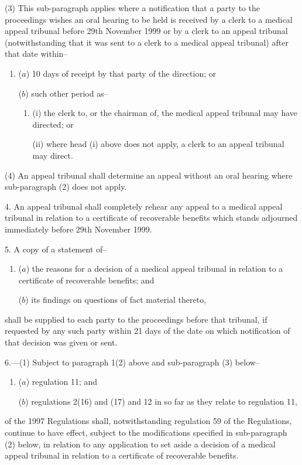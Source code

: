 \documentclass[12pt,a4paper]{article}
\begin{document}
(3) This sub-paragraph applies where a notification that a party to the proceedings wishes an oral hearing to be held is received by a clerk to a medical appeal tribunal before 29th November 1999 or by a clerk to an appeal tribunal (notwithstanding that it was sent to a clerk to a medical appeal tribunal) after that date within–
\begin{enumerate}\item[]
($a$) 10 days of receipt by that party of the direction; or

($b$) such other period as–
\begin{enumerate}\item[]
(i) the clerk to, or the chairman of, the medical appeal tribunal may have directed; or

(ii) where head (i)  above does not apply, a clerk to an appeal tribunal may direct.
\end{enumerate}
\end{enumerate}

(4) An appeal tribunal shall determine an appeal without an oral hearing where sub-paragraph (2) does not apply.

\medskip

4.  An appeal tribunal shall completely rehear any appeal to a medical appeal tribunal in relation to a certificate of recoverable benefits which stands adjourned immediately before 29th November 1999.

\medskip

5.  A copy of a statement of–
\begin{enumerate}\item[]
($a$) the reasons for a decision of a medical appeal tribunal in relation to a certificate of recoverable benefits; and

($b$) its findings on questions of fact material thereto,
\end{enumerate}
shall be supplied to each party to the proceedings before that tribunal, if requested by any such party within 21 days of the date on which notification of that decision was given or sent.

\medskip

6.---(1)  Subject to paragraph 1(2) above and sub-paragraph (3) below–
\begin{enumerate}\item[]
($a$) regulation 11; and

($b$) regulations 2(16) and (17) and 12 in so far as they relate to regulation 11,
\end{enumerate}
of the 1997 Regulations shall, notwithstanding regulation 59 of the Regulations, continue to have effect, subject to the modifications specified in sub-paragraph (2) below, in relation to any application to set aside a decision of a medical appeal tribunal in relation to a certificate of recoverable benefits.
\end{document}
